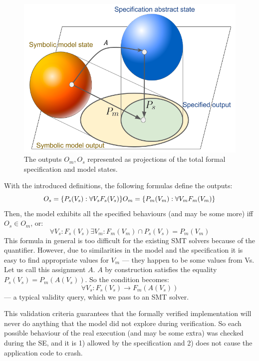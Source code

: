 \documentclass[letterpaper,twocolumn,10pt]{article}
\begin{document}
\begin{figure}[h]
    \centering
    \includegraphics[width=\columnwidth]{figures/projections.png}
    \caption{The outputs \(O_m, O_s\) represented as projections of the total formal specification and model states.}
    \label{projections}
\end{figure}

With the introduced definitions, the following formulas define the outputs:
\[
O_s = \{P_s(V_s): \forall V_s F_s(V_s)\} \\
O_m = \{P_m(V_m) : \forall V_m F_m(V_m)\}
\]
Then, the model exhibits all the specified behaviours (and may be some more) iff \(O_s \in O_m\), or: 
\[
\forall V_s : F_s(V_s) \exists V_m : F_m (V_m) \cap P_s(V_s) = P_m(V_m)
\]
This formula in general is too difficult for the existing SMT solvers because of the quantifier. However, due to similarities in the model and the specification it is easy to find appropriate values for \(V_m\) --- they happen to be some values from Vs. Let us call this assignment \(A\). \(A\) by construction satisfies the equality \(P_s(V_s)=P_m(A(V_s))\). So the condition becomes:
\[
\forall V_s : F_s(V_s) \rightarrow F_m(A(V_s))
\]
  --- a typical validity query, which we pass  to an SMT solver.
  
This validation criteria guarantees that the formally verified implementation will never do anything that the model did not explore during verification. So each possible behaviour of the real execution (and may be some extra) was checked during the SE, and it is 1) allowed by the specification and 2) does not cause the application code to crash.
\end{document}

